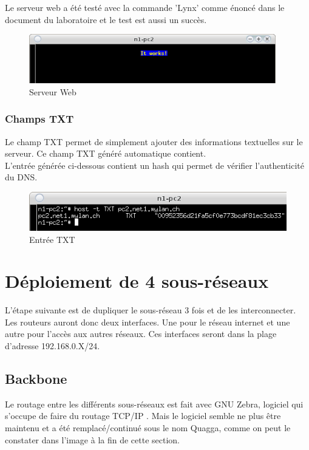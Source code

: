 \documentclass{article}
\begin{document}
Le serveur web a été testé avec la commande 'Lynx' comme énoncé dans le document du laboratoire et le test est aussi un succès. \cite{doc-labo}

\begin{figure}[!h]
	\centering
	\includegraphics{./captures/ItWorks-www.png}
	\caption{Serveur Web}
	\label{fig:Serveur Web}
\end{figure}

\subsubsection{Champs TXT}

Le champ TXT permet de simplement ajouter des informations textuelles sur le serveur. Ce champ TXT généré automatique contient.\cite{TXT}\\

L'entrée générée ci-dessous contient un hash qui permet de vérifier l'authenticité du DNS.

\begin{figure}[!h]
	\centering
	\includegraphics{./captures/txt-entry.png}
	\caption{Entrée TXT}
	\label{fig:Entrée TXT}
\end{figure}

\clearpage

\section{Déploiement de 4 sous-réseaux}
L'étape suivante est de dupliquer le sous-réseau 3 fois et de les interconnecter. Les routeurs auront donc deux interfaces. Une pour le réseau internet et une autre pour l'accès aux autres réseaux. Ces interfaces seront dans la plage d'adresse 192.168.0.X/24.\\

\subsection{Backbone}
Le routage entre les différents sous-réseaux est fait avec GNU Zebra, logiciel qui s'occupe de faire du routage TCP/IP \cite{Zebra}. Mais le logiciel semble ne plus être maintenu et a été remplacé/continué sous le nom Quagga, comme on peut le constater dans l'image à la fin de cette section.\\
\end{document}
